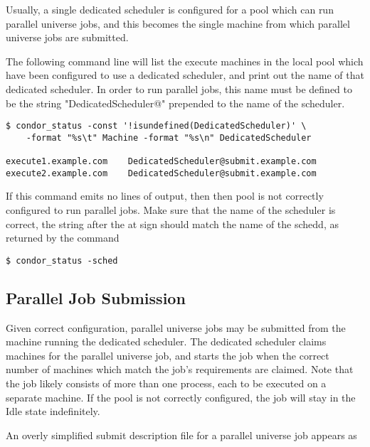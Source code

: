 Usually, a single dedicated scheduler is configured for a pool
which can run parallel universe jobs, and this 
becomes the single machine from which parallel universe
jobs are submitted.

The following command line will list the execute machines 
in the local pool which have been configured to use a dedicated
scheduler, and print out the name of that dedicated scheduler.
In order to run parallel jobs, this name must be defined to be
the string "DedicatedScheduler@" prepended to the name of the
scheduler.

\begin{verbatim}
$ condor_status -const '!isundefined(DedicatedScheduler)' \
	-format "%s\t" Machine -format "%s\n" DedicatedScheduler

execute1.example.com	DedicatedScheduler@submit.example.com
execute2.example.com	DedicatedScheduler@submit.example.com

\end{verbatim}

If this command emits no lines of output, then then pool is
not correctly configured to run parallel jobs.  Make sure that
the name of the scheduler is correct, the string after the
at sign should match the name of the schedd, as returned by the
command

\begin{verbatim}
$ condor_status -sched
\end{verbatim}

\subsection{\label{sec:parallel-submit}Parallel Job Submission}

Given correct configuration, parallel universe jobs may be submitted
from the machine running the dedicated scheduler.
The dedicated scheduler claims machines for the parallel universe job,
and starts the job when the correct number of machines which match
the job's requirements are claimed.
Note that the job likely consists of more than one process,
each to be executed on a separate machine.  If the pool is
not correctly configured, the job will stay in the Idle state
indefinitely.

An overly simplified submit description file for a parallel universe
job appears as


